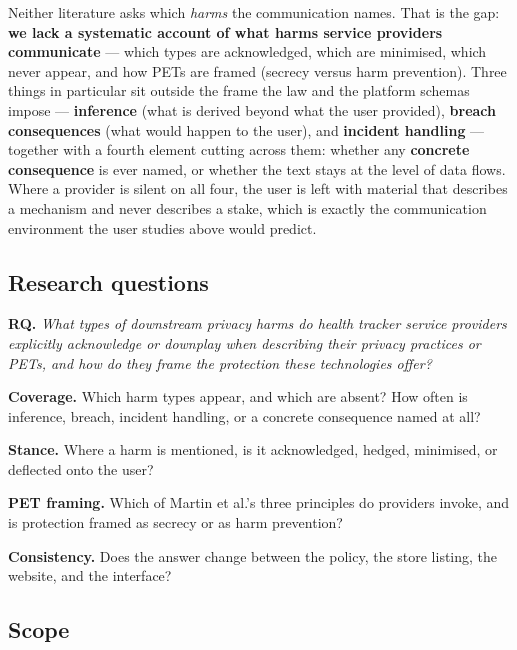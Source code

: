 \documentclass[10pt,a4paper]{article}
\begin{document}
Neither literature asks which \emph{harms} the communication names. That is the
gap: \textbf{we lack a systematic account of what harms service providers
communicate} --- which types are acknowledged, which are minimised, which never
appear, and how PETs are framed (secrecy versus harm prevention). Three things
in particular sit outside the frame the law and the platform schemas impose ---
\textbf{inference} (what is derived beyond what the user provided),
\textbf{breach consequences} (what would happen to the user), and
\textbf{incident handling} --- together with a fourth element cutting across
them: whether any \textbf{concrete consequence} is ever named, or whether the
text stays at the level of data flows. Where a provider is silent on all four,
the user is left with material that describes a mechanism and never describes a
stake, which is exactly the communication environment the user studies above
would predict.

\subsection*{Research questions}

\noindent\textbf{RQ.} \emph{What types of downstream privacy harms do health
tracker service providers explicitly acknowledge or downplay when describing
their privacy practices or PETs, and how do they frame the protection these
technologies offer?}

\begin{description}[leftmargin=1.6cm,style=nextline,itemsep=1pt,topsep=2pt]
  \item[\textbf{RQ1}] \textbf{Coverage.} Which harm types appear, and which are
    absent? How often is inference, breach, incident handling, or a concrete
    consequence named at all?
  \item[\textbf{RQ2}] \textbf{Stance.} Where a harm is mentioned, is it
    acknowledged, hedged, minimised, or deflected onto the user?
  \item[\textbf{RQ3}] \textbf{PET framing.} Which of Martin et al.'s three
    principles do providers invoke, and is protection framed as secrecy or as
    harm prevention?
  \item[\textbf{RQ4}] \textbf{Consistency.} Does the answer change between the
    policy, the store listing, the website, and the interface?
\end{description}

\subsection*{Scope}
\end{document}
